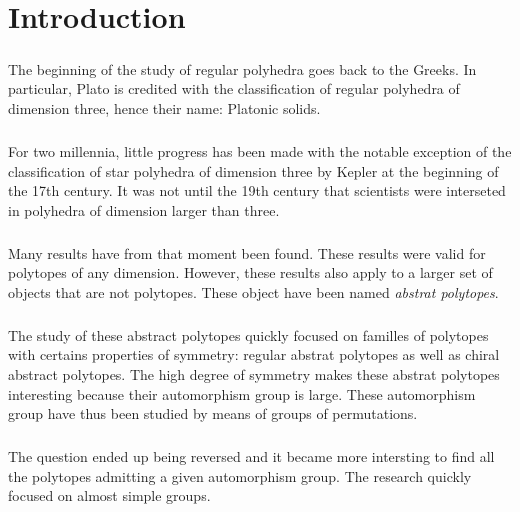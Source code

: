 \chapter*{Introduction}

\paragraph{}
The beginning of the study of regular polyhedra goes back to the Greeks. In particular, Plato is credited with the classification of regular polyhedra of dimension three, hence their name: Platonic solids.

\paragraph{}
For two millennia, little progress has been made with the notable exception of the classification of star polyhedra of dimension three by Kepler at the beginning of the 17th century. It was not until the 19th century that scientists were interseted in polyhedra of dimension larger than three.

\paragraph{}
Many results have from that moment been found. These results were valid for polytopes of any dimension. However, these results also apply to a larger set of objects that are not polytopes. These object have been named \textit{abstrat polytopes}.

\paragraph{}
The study of these abstract polytopes quickly focused on familles of polytopes with certains properties of symmetry: regular abstrat polytopes as well as chiral abstract polytopes. The high degree of symmetry makes these abstrat polytopes interesting because their automorphism group is large. These automorphism group have thus been studied by means of groups of permutations.

\paragraph{}
The question ended up being reversed and it became more intersting to find all the polytopes admitting a given automorphism group. The research quickly focused on almost simple groups.

